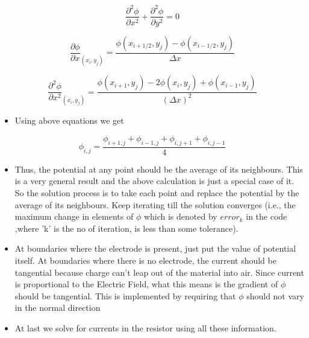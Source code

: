 \documentclass[11pt, a4paper]{article}
\begin{document}
    \begin{equation}
    \frac{\partial^{2} \phi}{\partial x^{2}}+ \frac{\partial^{2} \phi}{\partial y^{2}} = 0
     \end{equation}
    
    \begin{equation}
    \frac{\partial \phi}{\partial x}_{(x_i,y_j)} = \frac{\phi(x_{i+1/2},y_j) - \phi(x_{i-1/2},y_j)}{\Delta x}
     \end{equation}
    
    \begin{equation}
    \frac{\partial^{2} \phi}{\partial x^{2}}_{(x_i,y_j)} = \frac{\phi(x_{i+1},y_j) -2\phi(x_i,y_j)+ \phi(x_{i-1},y_j)}{(\Delta x)^{2}}
     \end{equation}
    
    \begin{itemize}
    \item
      Using above equations we get
    \end{itemize}
    
    \begin{equation}
            \phi_{i,j} = \frac{\phi_{i+1,j} + \phi_{i-1,j} + \phi_{i,j+1} + \phi_{i,j-1}}{4} 
    \end{equation}
    
    \begin{itemize}
    \item
      Thus, the potential at any point should be the average of its
      neighbours. This is a very general result and the above calculation is
      just a special case of it. So the solution process is to take each
      point and replace the potential by the average of its neighbours. Keep
      iterating till the solution converges (i.e., the maximum change in
      elements of \(\phi\) which is denoted by \(error_k\) in the code
      ,where 'k' is the no of iteration, is less than some tolerance).
    \item
      At boundaries where the electrode is present, just put the value of
      potential itself. At boundaries where there is no electrode, the
      current should be tangential because charge can't leap out of the
      material into air. Since current is proportional to the Electric
      Field, what this means is the gradient of \(\phi\) should be
      tangential. This is implemented by requiring that \(\phi\) should not
      vary in the normal direction
    \item
      At last we solve for currents in the resistor using all these
      information.
  \end{itemize}
\end{document}
